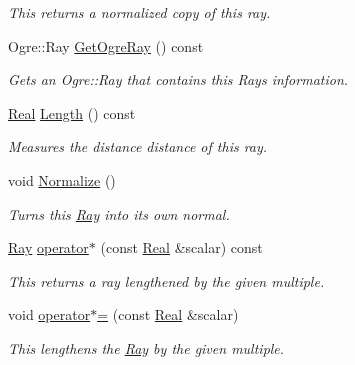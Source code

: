 \begin{DoxyCompactItemize}
\begin{DoxyCompactList}\small\item\em This returns a normalized copy of this ray. \item\end{DoxyCompactList}\item 
Ogre::Ray \hyperlink{classMezzanine_1_1Ray_af0dad9b998e8825d102d9da80fda10aa}{GetOgreRay} () const 
\begin{DoxyCompactList}\small\item\em Gets an Ogre::Ray that contains this Rays information. \item\end{DoxyCompactList}\item 
\hyperlink{namespaceMezzanine_a726731b1a7df72bf3583e4a97282c6f6}{Real} \hyperlink{classMezzanine_1_1Ray_a5c02a547876c4f590af181acdc81b486}{Length} () const 
\begin{DoxyCompactList}\small\item\em Measures the distance distance of this ray. \item\end{DoxyCompactList}\item 
void \hyperlink{classMezzanine_1_1Ray_a0f0605e55999112a5f1ae0e3a842593d}{Normalize} ()
\begin{DoxyCompactList}\small\item\em Turns this \hyperlink{classMezzanine_1_1Ray}{Ray} into its own normal. \item\end{DoxyCompactList}\item 
\hyperlink{classMezzanine_1_1Ray}{Ray} \hyperlink{classMezzanine_1_1Ray_a55c32bfa8ee017b3730c1a25aeb2a168}{operator$\ast$} (const \hyperlink{namespaceMezzanine_a726731b1a7df72bf3583e4a97282c6f6}{Real} \&scalar) const 
\begin{DoxyCompactList}\small\item\em This returns a ray lengthened by the given multiple. \item\end{DoxyCompactList}\item 
void \hyperlink{classMezzanine_1_1Ray_aae46f14a24ddbf11e841f73121e513b7}{operator$\ast$=} (const \hyperlink{namespaceMezzanine_a726731b1a7df72bf3583e4a97282c6f6}{Real} \&scalar)
\begin{DoxyCompactList}\small\item\em This lengthens the \hyperlink{classMezzanine_1_1Ray}{Ray} by the given multiple. \item\end{DoxyCompactList}\item 

\end{DoxyCompactItemize}
